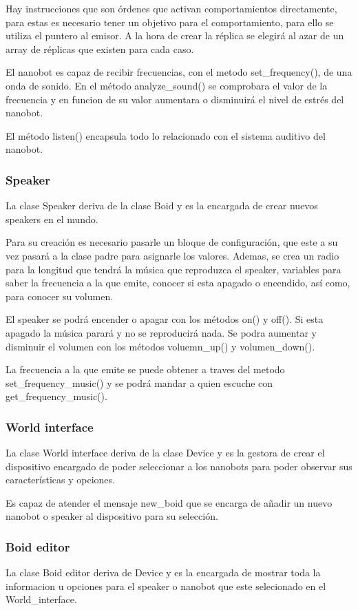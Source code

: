 Hay instrucciones que son órdenes que activan comportamientos directamente, para estas es necesario tener un objetivo para el comportamiento, para ello se utiliza el puntero al emisor. A la hora de crear la réplica se elegirá al azar de un array de réplicas que existen para cada caso.
 
El nanobot es capaz de recibir frecuencias, con el metodo set\_frequency(), de una onda de sonido. En el método analyze\_sound() se comprobara el valor de la frecuencia y en funcion de su valor aumentara o disminuirá el nivel de estrés del nanobot.


El método listen() encapsula todo lo relacionado con el sistema auditivo del nanobot.

\subsubsection{Speaker}
\label{sec:speaker}

La clase Speaker deriva de la clase Boid y es la encargada de crear nuevos speakers en el mundo.

Para su creación es necesario pasarle un bloque de configuración, que este a su vez pasará a la clase padre para asignarle los valores. Ademas, se crea un radio para la longitud que tendrá la música que reproduzca el speaker, variables para saber la frecuencia a la que emite, conocer si esta apagado o encendido, así como, para conocer su volumen.

El speaker se podrá encender o apagar con los métodos on() y off(). Si esta apagado la música parará y no se reproducirá nada. Se podra aumentar y disminuir el volumen con los métodos voluemn\_up() y volumen\_down().

La frecuencia a la que emite se puede obtener a traves del metodo set\_frequency\_music() y se podrá mandar a quien escuche con get\_frequency\_music().

\subsubsection{World interface}
\label{sec:world_interface}
La clase World interface deriva de la clase Device y es la gestora de crear el dispositivo encargado de poder seleccionar a los nanobots para poder observar sus características y opciones.

Es capaz de atender el mensaje new\_boid que se encarga de añadir un nuevo nanobot o speaker al dispositivo para su selección. 

\subsubsection{Boid editor}
\label{sec:boid_editor}
La clase Boid editor deriva de Device y es la encargada de mostrar toda la informacion u opciones para el speaker o nanobot que este selecionado en el World\_interface. 

